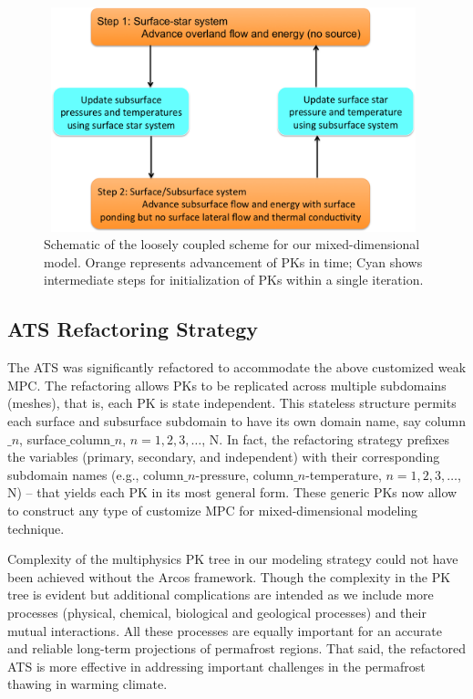 \documentclass[review]{elsarticle}
\begin{document}

\begin{figure}[!htpb]
\centering
\includegraphics[height = 6.5cm, width=11cm]{figures/coupling-scheme2.png}
\caption{Schematic of the loosely coupled scheme for our mixed-dimensional model. Orange represents advancement of PKs in time; Cyan shows intermediate steps for initialization of PKs within a single iteration.}
\label{coupling-schematic}
\end{figure}


\subsection{ATS Refactoring Strategy}
The ATS was significantly refactored to accommodate the above customized weak MPC. The refactoring allows PKs to be replicated across multiple subdomains (meshes), that is, each PK is state independent. This stateless structure permits each surface and subsurface subdomain to have its own domain name, say 
column$\_n$, surface$\_$column$\_n$, $n=1,2,3, \dots$, N. In fact, the refactoring strategy prefixes the variables (primary, secondary, and independent) with their corresponding subdomain names (e.g., column$\_n$-pressure, column$\_n$-temperature, $n=1,2,3, \dots$, N) -- that yields each PK in its most general form. These generic PKs now allow to construct any type of customize MPC for mixed-dimensional modeling technique.

Complexity of the multiphysics PK tree in our modeling strategy could not have been achieved without the Arcos framework. Though the complexity in the PK tree is evident but additional complications are intended as we include more processes (physical, chemical, biological and geological processes) and their mutual interactions. All these processes are equally important for an accurate and reliable long-term projections of permafrost regions. That said, the refactored ATS is more effective in addressing important challenges in the permafrost thawing in warming climate.
\end{document}
